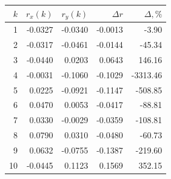 \begin{tabular}{rrrrr}\toprule
$k$ & $r_x(k)$ & $r_y(k)$ & $\Delta r$ & $\Delta,\%$ \\\midrule
1 & -0.0327 & -0.0340 & -0.0013 & -3.90 \\
2 & -0.0317 & -0.0461 & -0.0144 & -45.34 \\
3 & -0.0440 & 0.0203 & 0.0643 & 146.16 \\
4 & -0.0031 & -0.1060 & -0.1029 & -3313.46 \\
5 & 0.0225 & -0.0921 & -0.1147 & -508.85 \\
6 & 0.0470 & 0.0053 & -0.0417 & -88.81 \\
7 & 0.0330 & -0.0029 & -0.0359 & -108.81 \\
8 & 0.0790 & 0.0310 & -0.0480 & -60.73 \\
9 & 0.0632 & -0.0755 & -0.1387 & -219.60 \\
10 & -0.0445 & 0.1123 & 0.1569 & 352.15 \\
\bottomrule\end{tabular}